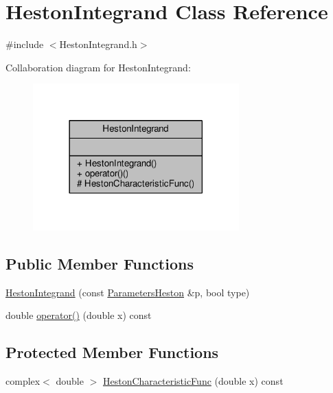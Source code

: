 \hypertarget{classHestonIntegrand}{}\section{Heston\+Integrand Class Reference}
\label{classHestonIntegrand}


{\ttfamily \#include $<$Heston\+Integrand.\+h$>$}



Collaboration diagram for Heston\+Integrand\+:
\nopagebreak
\begin{figure}[H]
\begin{center}
\leavevmode
\includegraphics[width=225pt]{classHestonIntegrand__coll__graph}
\end{center}
\end{figure}
\subsection*{Public Member Functions}
\begin{DoxyCompactItemize}
\item 
\hyperlink{classHestonIntegrand_a369615104bd1cb28abf99a9ae2198e3e}{Heston\+Integrand} (const \hyperlink{classParametersHeston}{Parameters\+Heston} \&p, bool type)
\item 
double \hyperlink{classHestonIntegrand_ae97c087bf9c211739a3d35d7dc6a5c94}{operator()} (double x) const
\end{DoxyCompactItemize}
\subsection*{Protected Member Functions}
\begin{DoxyCompactItemize}
\item 
complex$<$ double $>$ \hyperlink{classHestonIntegrand_a313003092ca44cd216cd3d47305c24ec}{Heston\+Characteristic\+Func} (double x) const
\end{DoxyCompactItemize}


